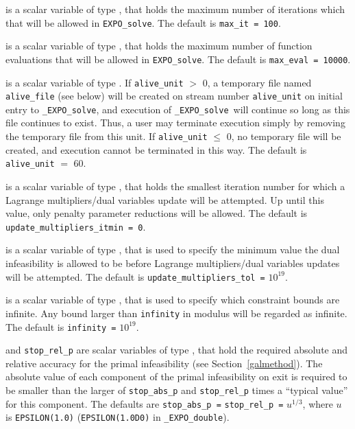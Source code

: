 \documentclass{galahad}
\newcommand{\packagename}{EXPO}
\newcommand{\fullpackagename}{\libraryname\_\packagename}
\newcommand{\solver}{{\tt \fullpackagename\_solve}}
\begin{document}
\begin{description}
 is a scalar variable of type \integer, that holds the
maximum number of iterations which that will be allowed in 
{\tt \packagename\_solve}.
The default is {\tt max\_it = 100}.

 is a scalar variable of type \integer, that holds the
maximum number of function evaluations that will be allowed in 
{\tt \packagename\_solve}.
The default is {\tt max\_eval = 10000}.

 is a scalar variable of type \integer.
If {\tt alive\_unit} $>$ 0, a temporary file named {\tt alive\_file} (see below)
will be created on stream number {\tt alive\_unit} on initial entry to
\solver, and execution of \solver\ will continue so
long as this file continues to exist. Thus, a user may terminate execution
simply by removing the temporary file from this unit.
If {\tt alive\_unit} $\leq$ 0, no temporary file will be created, and
execution cannot be terminated in this way.
The default is {\tt alive\_unit} $=$ 60.

 is a scalar variable of type \integer, 
that holds the smallest iteration number for which a 
Lagrange multipliers/dual variables update will be attempted.
Up until this value, only penalty parameter reductions will be allowed.
The default is {\tt update\_multipliers\_itmin = 0}.

 is a scalar variable of type \realdp, that is 
used to specify the minimum value the dual infeasibility is allowed to be
before Lagrange multipliers/dual variables updates will be attempted.
The default is {\tt update\_multipliers\_tol =} $10^{19}$.

 is a scalar variable of type \realdp, that is used to
specify which constraint bounds are infinite.
Any bound larger than {\tt infinity} in modulus will be regarded as infinite.
The default is {\tt infinity =} $10^{19}$.

 and {\tt stop\_rel\_p}
are scalar variables of type \realdp, that hold the
required absolute and relative accuracy for the primal infeasibility
(see Section~\ref{galmethod}).
The absolute value of each component of the primal infeasibility
on exit is required to be smaller than the larger of {\tt stop\_abs\_p} and
{\tt stop\_rel\_p} times a ``typical value'' for this component.
The defaults are {\tt stop\_abs\_p =} {\tt stop\_rel\_p =} $u^{1/3}$,
where $u$ is {\tt EPSILON(1.0)} ({\tt EPSILON(1.0D0)} in
{\tt \fullpackagename\_double}).


\end{description}
\end{document}
